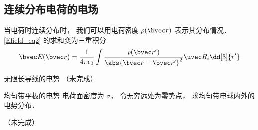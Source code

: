 \subsection{连续分布电荷的电场}
当电荷时连续分布时， 我们可以用电荷密度 $\rho(\bvec r)$ 表示其分布情况． \autoref{Efield_eq2} 的求和变为三重积分
\begin{equation}
\bvec E(\bvec r) = \frac{1}{4\pi\epsilon_0} \int \frac{\rho(\bvec r')}{\abs{\bvec r - \bvec r'}^2} \uvec R_i \dd[3]{r'}
\end{equation}

\begin{example}{无限长导线的电势}\label{Efield_ex1}
（未完成）
\end{example}


\begin{example}{均匀带平板的电势}\label{Efield_ex2}
电荷面密度为 $\sigma$， 令无穷远处为零势点， 求均匀带电球内外的电势分布．

（未完成）
\end{example}
